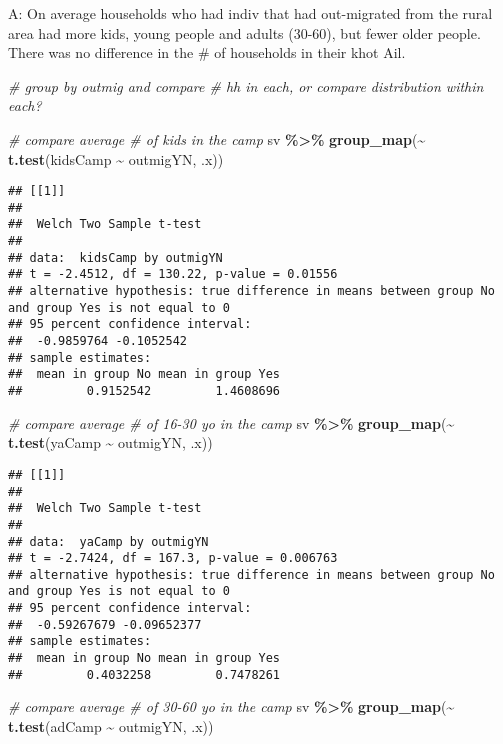 \documentclass[
]{article}
\newenvironment{Shaded}{\begin{snugshade}}{\end{snugshade}}
\newcommand{\CommentTok}[1]{\textcolor[rgb]{0.56,0.35,0.01}{\textit{#1}}}
\newcommand{\FunctionTok}[1]{\textcolor[rgb]{0.13,0.29,0.53}{\textbf{#1}}}
\newcommand{\NormalTok}[1]{#1}
\newcommand{\SpecialCharTok}[1]{\textcolor[rgb]{0.81,0.36,0.00}{\textbf{#1}}}
\begin{document}
A: On average households who had indiv that had out-migrated from the
rural area had more kids, young people and adults (30-60), but fewer
older people. There was no difference in the \# of households in their
khot Ail.

\begin{Shaded}
\begin{Highlighting}[]
\CommentTok{\# group by outmig and compare \# hh in each, or compare distribution within each?}

\CommentTok{\# compare average \# of kids in the camp}
\NormalTok{sv }\SpecialCharTok{\%\textgreater{}\%} \FunctionTok{group\_map}\NormalTok{(}\SpecialCharTok{\textasciitilde{}} \FunctionTok{t.test}\NormalTok{(kidsCamp }\SpecialCharTok{\textasciitilde{}}\NormalTok{ outmigYN, .x))}
\end{Highlighting}
\end{Shaded}

\begin{verbatim}
## [[1]]
## 
##  Welch Two Sample t-test
## 
## data:  kidsCamp by outmigYN
## t = -2.4512, df = 130.22, p-value = 0.01556
## alternative hypothesis: true difference in means between group No and group Yes is not equal to 0
## 95 percent confidence interval:
##  -0.9859764 -0.1052542
## sample estimates:
##  mean in group No mean in group Yes 
##         0.9152542         1.4608696
\end{verbatim}

\begin{Shaded}
\begin{Highlighting}[]
\CommentTok{\# compare average \# of 16{-}30 yo in the camp}
\NormalTok{sv }\SpecialCharTok{\%\textgreater{}\%} \FunctionTok{group\_map}\NormalTok{(}\SpecialCharTok{\textasciitilde{}} \FunctionTok{t.test}\NormalTok{(yaCamp }\SpecialCharTok{\textasciitilde{}}\NormalTok{ outmigYN, .x))}
\end{Highlighting}
\end{Shaded}

\begin{verbatim}
## [[1]]
## 
##  Welch Two Sample t-test
## 
## data:  yaCamp by outmigYN
## t = -2.7424, df = 167.3, p-value = 0.006763
## alternative hypothesis: true difference in means between group No and group Yes is not equal to 0
## 95 percent confidence interval:
##  -0.59267679 -0.09652377
## sample estimates:
##  mean in group No mean in group Yes 
##         0.4032258         0.7478261
\end{verbatim}

\begin{Shaded}
\begin{Highlighting}[]
\CommentTok{\# compare average \# of 30{-}60 yo in the camp}
\NormalTok{sv }\SpecialCharTok{\%\textgreater{}\%} \FunctionTok{group\_map}\NormalTok{(}\SpecialCharTok{\textasciitilde{}} \FunctionTok{t.test}\NormalTok{(adCamp }\SpecialCharTok{\textasciitilde{}}\NormalTok{ outmigYN, .x))}
\end{Highlighting}
\end{Shaded}
\end{document}
